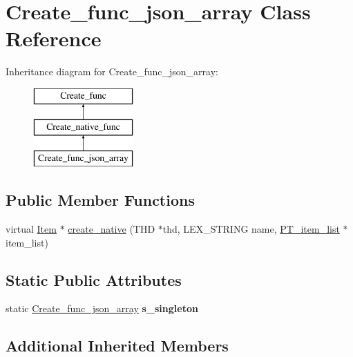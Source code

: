 \hypertarget{classCreate__func__json__array}{}\section{Create\+\_\+func\+\_\+json\+\_\+array Class Reference}
\label{classCreate__func__json__array}
Inheritance diagram for Create\+\_\+func\+\_\+json\+\_\+array\+:\begin{figure}[H]
\begin{center}
\leavevmode
\includegraphics[height=3.000000cm]{classCreate__func__json__array}
\end{center}
\end{figure}
\subsection*{Public Member Functions}
\begin{DoxyCompactItemize}
\item 
virtual \mbox{\hyperlink{classItem}{Item}} $\ast$ \mbox{\hyperlink{classCreate__func__json__array_a61d0a2e46dbcdd2c61ef5abb343c878f}{create\+\_\+native}} (T\+HD $\ast$thd, L\+E\+X\+\_\+\+S\+T\+R\+I\+NG name, \mbox{\hyperlink{classPT__item__list}{P\+T\+\_\+item\+\_\+list}} $\ast$item\+\_\+list)
\end{DoxyCompactItemize}
\subsection*{Static Public Attributes}
\begin{DoxyCompactItemize}
\item 
\mbox{\label{classCreate__func__json__array_ae4b291383ae84c9cf568ce39091319e2}} 
static \mbox{\hyperlink{classCreate__func__json__array}{Create\+\_\+func\+\_\+json\+\_\+array}} {\bfseries s\+\_\+singleton}
\end{DoxyCompactItemize}
\subsection*{Additional Inherited Members}


